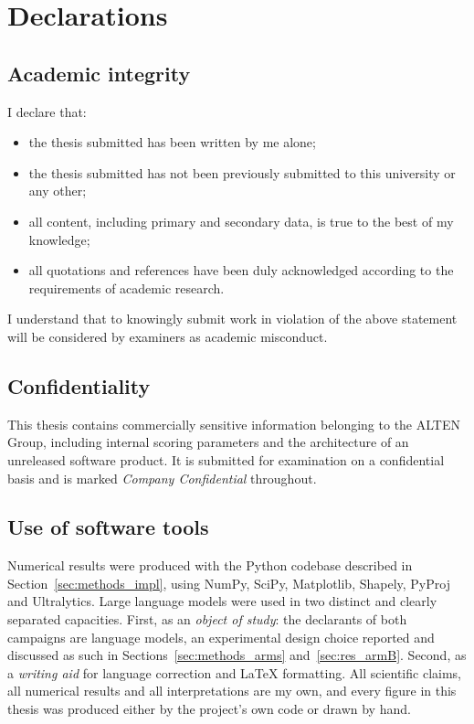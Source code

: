 \section*{Declarations}
\label{sec:declaration}

\subsection*{Academic integrity}

I declare that:

\begin{itemize}[leftmargin=1.4em, itemsep=2pt]
    \item the thesis submitted has been written by me alone;
    \item the thesis submitted has not been previously submitted to this
          university or any other;
    \item all content, including primary and secondary data, is true to the best
          of my knowledge;
    \item all quotations and references have been duly acknowledged according to
          the requirements of academic research.
\end{itemize}

I understand that to knowingly submit work in violation of the above statement
will be considered by examiners as academic misconduct.

\subsection*{Confidentiality}

This thesis contains commercially sensitive information belonging to the ALTEN
Group, including internal scoring parameters and the architecture of an
unreleased software product. It is submitted for examination on a confidential
basis and is marked \emph{Company Confidential} throughout.

\subsection*{Use of software tools}

Numerical results were produced with the Python codebase described in
Section~\ref{sec:methods_impl}, using NumPy, SciPy, Matplotlib, Shapely, PyProj
and Ultralytics. Large language models were used in two distinct and clearly
separated capacities. First, as an \emph{object of study}: the declarants of both
campaigns are language models, an experimental design choice reported and
discussed as such in Sections~\ref{sec:methods_arms} and~\ref{sec:res_armB}.
Second, as a \emph{writing aid} for language correction and \LaTeX{} formatting.
All scientific claims, all numerical results and all interpretations are my own,
and every figure in this thesis was produced either by the project's own code or
drawn by hand.
